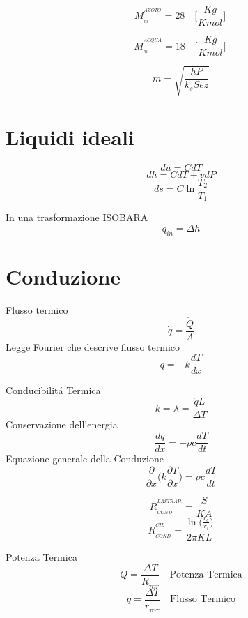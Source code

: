 \documentclass[10pt,portrait,a4paper]{article}
\begin{document}
\begin{multicols}{2}
\[ M_{_{m}}^{^{AZOTO}} = 28 \quad \Big [ \frac {Kg}{Kmol} \Big ] \ \]

\[ M_{_{m}}^{^{ACQUA}} = 18 \quad \Big [ \frac {Kg}{Kmol} \Big ] \ \]



\[ m = \sqrt{
	\frac{hP}{k_s Sez}
}
\]



\section{Liquidi ideali}
\[
	du = CdT
	\]
\[
	dh = CdT + vdP
	\]
\[
	ds = C\ln\frac{T_2}{T_1}
	\]

	In una trasformazione ISOBARA
\[
	q_{in} = \Delta h
	\]	

\section{Conduzione}
Flusso termico
\[
	\dot{q} = \frac{\dot{Q}}{A}
	\]
Legge Fourier che descrive flusso termico
\[
	\dot{q} = -k\frac{dT}{dx}
	\]

	Conducibilitá Termica
	\[ k = \lambda = \frac{\dot{q}L}{\Delta T}\]
Conservazione dell'energia
\[
	\frac{d\dot{q}}{dx}=-\rho c\frac{dT}{dt}
	\]
Equazione generale della Conduzione
\[\frac{\partial}{\partial x}\bigg( k\frac{\partial T}{\partial x} \bigg) = \rho c \frac{dT}{dt}
\]

\[ R_{_{COND}}^{^{LASTRA P.}} =\frac{S}{KA}\]
\[ R_{_{COND}}^{^{CIL}} = \frac {\ln \Big ( \frac {r_{e}}{r_{i}} \Big )} {2 \pi KL} \]


Potenza Termica
\[ \dot{Q} =\frac{\Delta T}{R_{_{TOT}}}  \quad \textrm{Potenza Termica} \]
\[ \dot{q} =\frac{\Delta T}{r_{_{TOT}}}  \quad \textrm{Flusso Termico} \]

\end{multicols}
\end{document}
